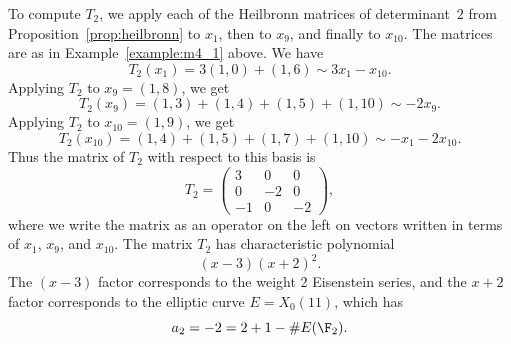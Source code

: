 \begin{example}
To compute $T_2$, we apply each of the Heilbronn
matrices of determinant~$2$ from Proposition~\ref{prop:heilbronn}
to $x_1$, then to $x_9$, and finally to $x_{10}$.
The matrices are as in Example~\ref{example:m4_1} above.
We have
$$
  T_2(x_1) = 3(1,0) + (1,6) \sim 3x_1 - x_{10}.
$$
Applying $T_2$ to $x_9=(1,8)$, we get
$$
 T_2(x_9) =  (1,3)  + (1,4) + (1,5) + (1,10) \sim -2x_9.
$$
Applying $T_2$ to $x_{10}=(1,9)$, we get
$$
T_2(x_{10})= (1,4)+(1,5) + (1,7) + (1,10) \sim -x_1 - 2x_{10}.
$$
Thus the matrix of $T_2$ with respect to this basis is
$$
T_2 = 
\left(\begin{array}{ccc}
3&0&0\\
0&-2&0\\
-1&0&-2
\end{array}\right),
$$
where we write the matrix as an operator on the left on vectors
written in terms of $x_1$, $x_9$, and $x_{10}$.
The matrix $T_2$ has characteristic polynomial
$$
  (x-3) (x+2)^2.
$$
The $(x-3)$ factor corresponds to the weight $2$ Eisenstein
series, and the $x+2$ factor corresponds to the elliptic
curve $E=X_0(11)$, which has $$a_2 = -2 = 2+1 - \#E(\F_2).$$

\end{example}

